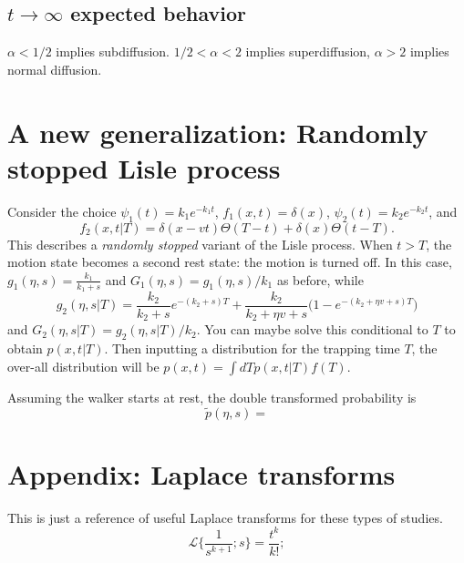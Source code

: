 \documentclass[11pt]{article}
\newcommand\be{\begin{equation}} %
\newcommand\ee{\end{equation}}   %
\newcommand\El{\mathcal{L}}
\begin{document}
\subsection{$t\rightarrow \infty$ expected behavior}
$\alpha<1/2$ implies subdiffusion. $1/2<\alpha<2$ implies superdiffusion, $\alpha>2$ implies normal diffusion.

\section{A new generalization: Randomly stopped Lisle process}

Consider the choice $\psi_1(t) = k_1e^{-k_1t}$, $f_1(x,t)=\delta(x)$, $\psi_2(t) = k_2e^{-k_2t}$, and 
\be f_2(x,t|T) = \delta(x-vt)\Theta(T-t) + \delta(x)\Theta(t-T).\ee
This describes a \textit{randomly stopped} variant of the Lisle process.
When $t>T$, the motion state becomes a second rest state: the motion is turned off.
In this case, $g_1(\eta,s) = \frac{k_1}{k_1+s}$ and $G_1(\eta,s) = g_1(\eta,s)/k_1$ as before, while
\be g_2(\eta,s|T) = \frac{k_2}{k_2+s}e^{-(k_2+s)T} + \frac{k_2}{k_2 + \eta v + s}\Big(1-e^{-(k_2 + \eta v + s)T}\Big)\ee
and $G_2(\eta,s|T) = g_2(\eta,s|T)/k_2$.
You can maybe solve this conditional to $T$ to obtain $p(x,t|T)$.
Then inputting a distribution for the trapping time $T$, the over-all distribution will be $p(x,t) = \int dT p(x,t|T)f(T)$.

Assuming the walker starts at rest, the double transformed probability is
\be \tilde{p}(\eta,s) = \ee


\section*{Appendix: Laplace transforms}
This is just a reference of useful Laplace transforms for these types of studies.
\be \El\Big\{\frac{1}{s^{k+1}};s\Big\} = \frac{t^k}{k!}; \label{eq:lap1}\ee
\end{document}
